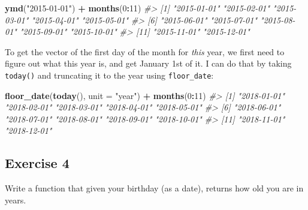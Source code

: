 \documentclass[]{book}
\newenvironment{Shaded}{\begin{snugshade}}{\end{snugshade}}
\newcommand{\CommentTok}[1]{\textcolor[rgb]{0.56,0.35,0.01}{\textit{#1}}}
\newcommand{\ControlFlowTok}[1]{\textcolor[rgb]{0.13,0.29,0.53}{\textbf{#1}}}
\newcommand{\DataTypeTok}[1]{\textcolor[rgb]{0.13,0.29,0.53}{#1}}
\newcommand{\DecValTok}[1]{\textcolor[rgb]{0.00,0.00,0.81}{#1}}
\newcommand{\KeywordTok}[1]{\textcolor[rgb]{0.13,0.29,0.53}{\textbf{#1}}}
\newcommand{\NormalTok}[1]{#1}
\newcommand{\OperatorTok}[1]{\textcolor[rgb]{0.81,0.36,0.00}{\textbf{#1}}}
\newcommand{\StringTok}[1]{\textcolor[rgb]{0.31,0.60,0.02}{#1}}
\theoremstyle{definition}
\theoremstyle{definition}
\theoremstyle{definition}
\theoremstyle{remark}
\begin{document}
\begin{Shaded}
\begin{Highlighting}[]
\KeywordTok{ymd}\NormalTok{(}\StringTok{"2015-01-01"}\NormalTok{) }\OperatorTok{+}\StringTok{ }\KeywordTok{months}\NormalTok{(}\DecValTok{0}\OperatorTok{:}\DecValTok{11}\NormalTok{)}
\CommentTok{#>  [1] "2015-01-01" "2015-02-01" "2015-03-01" "2015-04-01" "2015-05-01"}
\CommentTok{#>  [6] "2015-06-01" "2015-07-01" "2015-08-01" "2015-09-01" "2015-10-01"}
\CommentTok{#> [11] "2015-11-01" "2015-12-01"}
\end{Highlighting}
\end{Shaded}

To get the vector of the first day of the month for \emph{this} year, we
first need to figure out what this year is, and get January 1st of it. I
can do that by taking \texttt{today()} and truncating it to the year
using \texttt{floor\_date}:

\begin{Shaded}
\begin{Highlighting}[]
\KeywordTok{floor_date}\NormalTok{(}\KeywordTok{today}\NormalTok{(), }\DataTypeTok{unit =} \StringTok{"year"}\NormalTok{) }\OperatorTok{+}\StringTok{ }\KeywordTok{months}\NormalTok{(}\DecValTok{0}\OperatorTok{:}\DecValTok{11}\NormalTok{)}
\CommentTok{#>  [1] "2018-01-01" "2018-02-01" "2018-03-01" "2018-04-01" "2018-05-01"}
\CommentTok{#>  [6] "2018-06-01" "2018-07-01" "2018-08-01" "2018-09-01" "2018-10-01"}
\CommentTok{#> [11] "2018-11-01" "2018-12-01"}
\end{Highlighting}
\end{Shaded}

\hypertarget{exercise-4-23}{%
\subsection{Exercise 4}\label{exercise-4-23}}

Write a function that given your birthday (as a date), returns how old
you are in years.

\begin{Shaded}
\end{Shaded}
\end{document}
